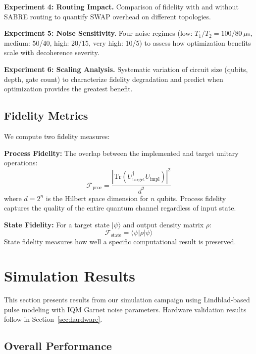 \documentclass[journal]{IEEEtran}
\newcommand{\ket}[1]{|#1\rangle}
\newcommand{\bra}[1]{\langle#1|}
\newcommand{\fid}{\mathcal{F}}
\begin{document}
\textbf{Experiment 4: Routing Impact.} Comparison of fidelity with and without SABRE routing to quantify SWAP overhead on different topologies.

\textbf{Experiment 5: Noise Sensitivity.} Four noise regimes (low: $T_1/T_2 = 100/80\ \mu$s, medium: 50/40, high: 20/15, very high: 10/5) to assess how optimization benefits scale with decoherence severity.

\textbf{Experiment 6: Scaling Analysis.} Systematic variation of circuit size (qubits, depth, gate count) to characterize fidelity degradation and predict when optimization provides the greatest benefit.

\subsection{Fidelity Metrics}

We compute two fidelity measures:

\textbf{Process Fidelity:} The overlap between the implemented and target unitary operations:
\begin{equation}
    \fid_{\text{proc}} = \frac{|\text{Tr}(U_{\text{target}}^{\dagger} U_{\text{impl}})|^2}{d^2}
\end{equation}
where $d = 2^n$ is the Hilbert space dimension for $n$ qubits. Process fidelity captures the quality of the entire quantum channel regardless of input state.

\textbf{State Fidelity:} For a target state $\ket{\psi}$ and output density matrix $\rho$:
\begin{equation}
    \fid_{\text{state}} = \bra{\psi}\rho\ket{\psi}
\end{equation}
State fidelity measures how well a specific computational result is preserved.

\section{Simulation Results}
\label{sec:results}

This section presents results from our simulation campaign using Lindblad-based pulse modeling with IQM Garnet noise parameters. Hardware validation results follow in Section~\ref{sec:hardware}.

\subsection{Overall Performance}
\end{document}
